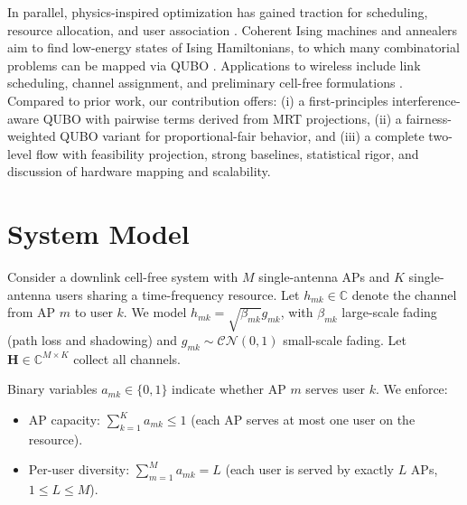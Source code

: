 In parallel, physics-inspired optimization has gained traction for scheduling, resource allocation, and user association \cite{kasi2021resource,grassl2022ising}. Coherent Ising machines and annealers aim to find low-energy states of Ising Hamiltonians, to which many combinatorial problems can be mapped via QUBO \cite{lucas2014ising,mcmahon2016fully,inagaki2016coherent,glover2018tutorial}. Applications to wireless include link scheduling, channel assignment, and preliminary cell-free formulations \cite{zhao2022joint}. Compared to prior work, our contribution offers: (i) a first-principles interference-aware QUBO with pairwise terms derived from MRT projections, (ii) a fairness-weighted QUBO variant for proportional-fair behavior, and (iii) a complete two-level flow with feasibility projection, strong baselines, statistical rigor, and discussion of hardware mapping and scalability.

\section{System Model}
Consider a downlink cell-free system with $M$ single-antenna APs and $K$ single-antenna users sharing a time-frequency resource. Let $h_{mk}\in\mathbb{C}$ denote the channel from AP $m$ to user $k$. We model $h_{mk}=\sqrt{\beta_{mk}} g_{mk}$, with $\beta_{mk}$ large-scale fading (path loss and shadowing) and $g_{mk}\sim \mathcal{CN}(0,1)$ small-scale fading. Let $\mathbf{H}\in \mathbb{C}^{M\times K}$ collect all channels.

Binary variables $a_{mk}\in\{0,1\}$ indicate whether AP $m$ serves user $k$. We enforce:
\begin{itemize}
\item AP capacity: $\sum_{k=1}^K a_{mk}\le 1$ (each AP serves at most one user on the resource).
\item Per-user diversity: $\sum_{m=1}^M a_{mk}=L$ (each user is served by exactly $L$ APs, $1\le L\le M$).
\end{itemize}

